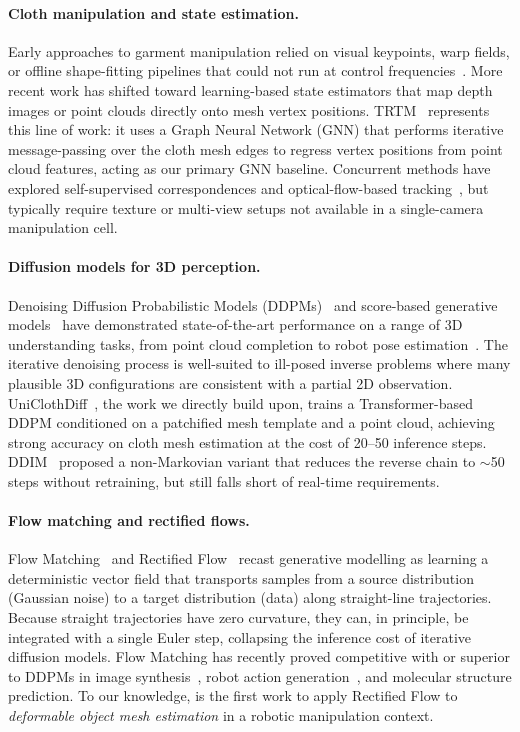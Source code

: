 \documentclass{article}
\begin{document}
\paragraph{Cloth manipulation and state estimation.}
Early approaches to garment manipulation relied on visual keypoints, warp fields, or offline shape-fitting pipelines that could not run at control frequencies~\cite{ha2022flingbot,avigal2022speedfolding}.
More recent work has shifted toward learning-based state estimators that map depth images or point clouds directly onto mesh vertex positions.
TRTM~\cite{trtm} represents this line of work: it uses a Graph Neural Network (GNN) that performs iterative message-passing over the cloth mesh edges to regress vertex positions from point cloud features, acting as our primary GNN baseline.
Concurrent methods have explored self-supervised correspondences and optical-flow-based tracking~\cite{garmentnets}, but typically require texture or multi-view setups not available in a single-camera manipulation cell.

\paragraph{Diffusion models for 3D perception.}
Denoising Diffusion Probabilistic Models (DDPMs)~\cite{ho2020ddpm} and score-based generative models~\cite{song2019score} have demonstrated state-of-the-art performance on a range of 3D understanding tasks, from point cloud completion to robot pose estimation~\cite{chi2023diffusion}.
The iterative denoising process is well-suited to ill-posed inverse problems where many plausible 3D configurations are consistent with a partial 2D observation.
UniClothDiff~\cite{tian2025uniclothdiff}, the work we directly build upon, trains a Transformer-based DDPM conditioned on a patchified mesh template and a point cloud, achieving strong accuracy on cloth mesh estimation at the cost of 20--50 inference steps.
DDIM~\cite{song2021ddim} proposed a non-Markovian variant that reduces the reverse chain to $\sim$50 steps without retraining, but still falls short of real-time requirements.

\paragraph{Flow matching and rectified flows.}
Flow Matching~\cite{lipman2023flow} and Rectified Flow~\cite{liu2023rectifiedflow} recast generative modelling as learning a deterministic vector field that transports samples from a source distribution (\eg Gaussian noise) to a target distribution (data) along straight-line trajectories.
Because straight trajectories have zero curvature, they can, in principle, be integrated with a single Euler step, collapsing the inference cost of iterative diffusion models.
Flow Matching has recently proved competitive with or superior to DDPMs in image synthesis~\cite{lipman2023flow}, robot action generation~\cite{chi2023diffusion}, and molecular structure prediction.
To our knowledge, \ours{} is the first work to apply Rectified Flow to \emph{deformable object mesh estimation} in a robotic manipulation context.
\end{document}

